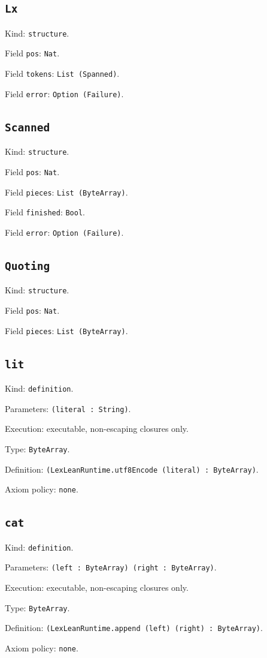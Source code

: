 \documentclass[11pt]{article}
\begin{document}
\subsection*{\texttt{Lx}}
\noindent Kind: \texttt{structure}.\par
\noindent Field \texttt{pos}: \texttt{Nat}.\par
\noindent Field \texttt{tokens}: \texttt{List (Spanned)}.\par
\noindent Field \texttt{error}: \texttt{Option (Failure)}.\par
\subsection*{\texttt{Scanned}}
\noindent Kind: \texttt{structure}.\par
\noindent Field \texttt{pos}: \texttt{Nat}.\par
\noindent Field \texttt{pieces}: \texttt{List (ByteArray)}.\par
\noindent Field \texttt{finished}: \texttt{Bool}.\par
\noindent Field \texttt{error}: \texttt{Option (Failure)}.\par
\subsection*{\texttt{Quoting}}
\noindent Kind: \texttt{structure}.\par
\noindent Field \texttt{pos}: \texttt{Nat}.\par
\noindent Field \texttt{pieces}: \texttt{List (ByteArray)}.\par
\subsection*{\texttt{lit}}
\noindent Kind: \texttt{definition}.\par
\noindent Parameters: \texttt{(literal : String)}.\par
\noindent Execution: executable, non-escaping closures only.\par
\noindent Type: \texttt{ByteArray}.\par
\noindent Definition: \texttt{(LexLeanRuntime.utf8Encode (literal) : ByteArray)}.\par
\noindent Axiom policy: \texttt{none}.\par
\subsection*{\texttt{cat}}
\noindent Kind: \texttt{definition}.\par
\noindent Parameters: \texttt{(left : ByteArray) (right : ByteArray)}.\par
\noindent Execution: executable, non-escaping closures only.\par
\noindent Type: \texttt{ByteArray}.\par
\noindent Definition: \texttt{(LexLeanRuntime.append (left) (right) : ByteArray)}.\par
\noindent Axiom policy: \texttt{none}.\par
\end{document}
